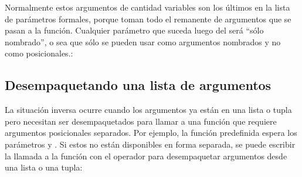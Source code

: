 \documentclass[a4,10pt,spanish]{sphinxmanual}
\begin{document}
\sphinxAtStartPar
Normalmente estos argumentos de cantidad variables son los últimos en la lista de parámetros formales, porque toman todo el remanente de argumentos que se pasan a la función. Cualquier parámetro que suceda luego del  será “sólo nombrado”, o sea que sólo se pueden usar como argumentos nombrados y no como posicionales.:

\begin{sphinxVerbatim}[commandchars=\\\{\}]
  
     
  
   
\end{sphinxVerbatim}


\subsection{Desempaquetando una lista de argumentos}
\label{\detokenize{tutorial/controlflow:unpacking-argument-lists}}\label{\detokenize{tutorial/controlflow:tut-unpacking-arguments}}
\sphinxAtStartPar
La situación inversa ocurre cuando los argumentos ya están en una lista o tupla pero necesitan ser desempaquetados para llamar a una función que requiere argumentos posicionales separados. Por ejemplo, la función predefinida  espera los parámetros  y . Si estos no están disponibles en forma separada, se puede escribir la llamada a la función con el operador \sphinxcode{\sphinxupquote{*}} para desempaquetar argumentos desde una lista o una tupla:
\end{document}
